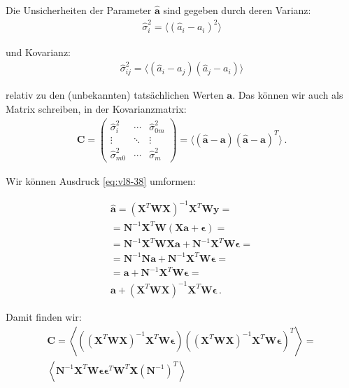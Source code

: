 Die Unsicherheiten der Parameter $\boldsymbol{\hat{a}}$ sind gegeben durch deren Varianz:
\begin{align}
\hat{\sigma}_i^2 = \langle ( \hat{a}_i - a_i )^2 \rangle
\label{eq:vl8-39}
\end{align}

und Kovarianz:
\begin{align}
\hat{\sigma}_{ij}^2 = \langle ( \hat{a}_i - a_j ) ( \hat{a}_j - a_i ) \rangle
\label{eq:vl8-40}
\end{align}

relativ zu den (unbekannten) tats\"achlichen Werten $\boldsymbol{a}$. Das k\"onnen wir auch als Matrix schreiben, in der Kovarianzmatrix:
\begin{align}
\boldsymbol{C} = 
\begin{pmatrix}
\hat{\sigma}_i^2  & \cdots & \hat{\sigma}_{0m}^2 \\
\vdots            & \ddots & \vdots            \\
\hat{\sigma}_{m0}^2 & \cdots & \hat{\sigma}_m^2  
\end{pmatrix}
= \langle ( \boldsymbol{\hat{a}} - \boldsymbol{a} )( \boldsymbol{\hat{a}} - \boldsymbol{a} )^T \rangle \,.
\label{eq:vl8-41}
\end{align}

Wir können Ausdruck \ref{eq:vl8-38} umformen:

\begin{align}
\boldsymbol{\hat{a}} = ( \boldsymbol{X}^T \boldsymbol{WX} )^{-1} \boldsymbol{X}^T \boldsymbol{Wy} = \\
= \boldsymbol{N}^{-1} \boldsymbol{X}^T \boldsymbol{W} \left( \boldsymbol{X} \boldsymbol{a} + \boldsymbol{\epsilon} \right) = \\
= \boldsymbol{N}^{-1} \boldsymbol{X}^T \boldsymbol{W} \boldsymbol{X} \boldsymbol{a} + \boldsymbol{N}^{-1} \boldsymbol{X}^T \boldsymbol{W} \boldsymbol{\epsilon} =\\
= \boldsymbol{N}^{-1} \boldsymbol{N} \boldsymbol{a} + \boldsymbol{N}^{-1} \boldsymbol{X}^T \boldsymbol{W} \boldsymbol{\epsilon} = \\
= \boldsymbol{a} + \boldsymbol{N}^{-1} \boldsymbol{X}^T \boldsymbol{W} \boldsymbol{\epsilon} = \\
\boldsymbol{a} + ( \boldsymbol{X}^T \boldsymbol{WX} )^{-1} \boldsymbol{X}^T \boldsymbol{W} \boldsymbol{\epsilon}\,.
\end{align}

Damit finden wir:
\begin{align}
\boldsymbol{C} = \left\langle \left( ( \boldsymbol{X}^T \boldsymbol{WX} )^{-1} \boldsymbol{X}^T \boldsymbol{W \epsilon} \right) \left( ( \boldsymbol{X}^T \boldsymbol{WX} )^{-1} \boldsymbol{X}^T \boldsymbol{W \epsilon} \right)^T \right\rangle = \\
\left\langle \boldsymbol{N}^{-1} \boldsymbol{X}^T \boldsymbol{W \epsilon}  \boldsymbol{\epsilon}^T  \boldsymbol{W}^T \boldsymbol{X} \left( \boldsymbol{N}^{-1}\right)^T \right\rangle
\label{eq:vl8-42}
\end{align}

